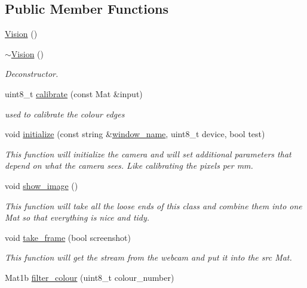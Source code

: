 \subsection*{Public Member Functions}
\begin{DoxyCompactItemize}
\item 
\hyperlink{class_vision_ad6899fb359fd485afbd309d6d7b0ae1f}{Vision} ()
\item 
\hyperlink{class_vision_a12bc039b4fcdb229e70c55d2660392a8}{$\sim$\+Vision} ()
\begin{DoxyCompactList}\small\item\em Deconstructor. \end{DoxyCompactList}\item 
uint8\+\_\+t \hyperlink{class_vision_af6f5c8e7c020e44d4f88789c3b8e123f}{calibrate} (const Mat \&input)
\begin{DoxyCompactList}\small\item\em used to calibrate the colour edges \end{DoxyCompactList}\item 
void \hyperlink{class_vision_afc55887fac6cea0954963cff0429a705}{initialize} (const string \&\hyperlink{class_vision_aefa7b216c7f6dac43438e0f9df163dae}{window\+\_\+name}, uint8\+\_\+t device, bool test)
\begin{DoxyCompactList}\small\item\em This function will initialize the camera and will set additional parameters that depend on what the camera sees. Like calibrating the pixels per mm. \end{DoxyCompactList}\item 
void \hyperlink{class_vision_aefb980ea81da98b4f5531cd46481ce2d}{show\+\_\+image} ()
\begin{DoxyCompactList}\small\item\em This function will take all the loose ends of this class and combine them into one Mat so that everything is nice and tidy. \end{DoxyCompactList}\item 
void \hyperlink{class_vision_afbaa5efe06c5af3d82fb4fc133788b5b}{take\+\_\+frame} (bool screenshot)
\begin{DoxyCompactList}\small\item\em This function will get the stream from the webcam and put it into the src Mat. \end{DoxyCompactList}\item 
Mat1b \hyperlink{class_vision_a10439f626238ba3628534e55f80e59b1}{filter\+\_\+colour} (uint8\+\_\+t colour\+\_\+number)

\end{DoxyCompactItemize}
